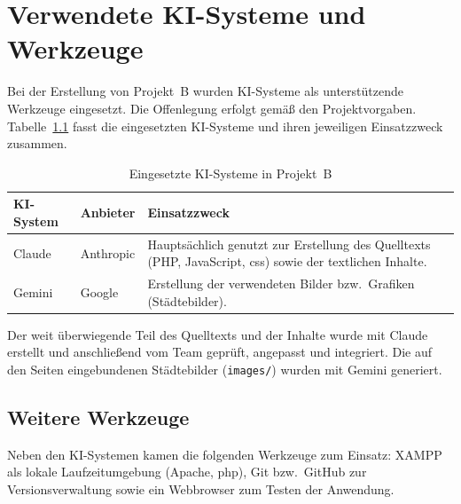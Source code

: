 \vspace{2\baselineskip}
\chapter{Verwendete KI-Systeme und Werkzeuge}
\label{ch:b-kitools}

Bei der Erstellung von Projekt~B wurden KI-Systeme als unterst\"utzende Werkzeuge eingesetzt.
Die Offenlegung erfolgt gem\"a\ss{} den Projektvorgaben. Tabelle~\ref{tab:b-kitools} fasst die
eingesetzten KI-Systeme und ihren jeweiligen Einsatzzweck zusammen.

\begin{table}[htbp]
\centering
\caption{Eingesetzte KI-Systeme in Projekt~B}
\label{tab:b-kitools}
\begin{tabularx}{\textwidth}{@{}l l X@{}}
\toprule
\textbf{KI-System} & \textbf{Anbieter} & \textbf{Einsatzzweck} \\
\midrule
Claude & Anthropic & Haupts\"achlich genutzt zur Erstellung des Quelltexts (PHP, JavaScript, \ac{css}) sowie der textlichen Inhalte. \\
\addlinespace
Gemini & Google & Erstellung der verwendeten Bilder bzw.\ Grafiken (St\"adtebilder). \\
\bottomrule
\end{tabularx}
\end{table}

Der weit \"uberwiegende Teil des Quelltexts und der Inhalte wurde mit Claude erstellt und
anschlie\ss{}end vom Team gepr\"uft, angepasst und integriert. Die auf den Seiten eingebundenen
St\"adtebilder (\texttt{images/}) wurden mit Gemini generiert.

\section{Weitere Werkzeuge}
Neben den KI-Systemen kamen die folgenden Werkzeuge zum Einsatz: XAMPP als lokale
Laufzeitumgebung (Apache, \ac{php}), Git bzw.\ GitHub zur Versionsverwaltung sowie ein
Webbrowser zum Testen der Anwendung.
